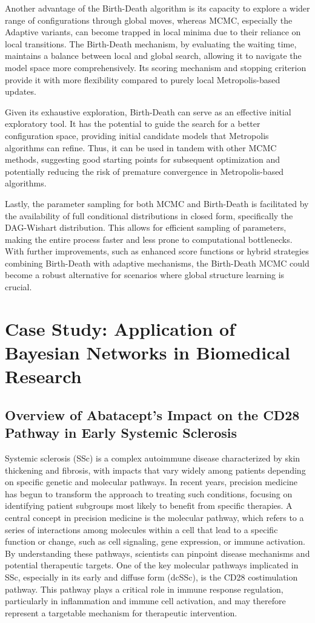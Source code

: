 \documentclass{report}
\begin{document}
Another advantage of the Birth-Death algorithm is its capacity to explore a wider range of configurations through global moves, whereas MCMC, especially the Adaptive variants, can become trapped in local minima due to their reliance on local transitions. The Birth-Death mechanism, by evaluating the waiting time, maintains a balance between local and global search, allowing it to navigate the model space more comprehensively. Its scoring mechanism and stopping criterion provide it with more flexibility compared to purely local Metropolis-based updates.

Given its exhaustive exploration, Birth-Death can serve as an effective initial exploratory tool. It has the potential to guide the search for a better configuration space, providing initial candidate models that Metropolis algorithms can refine. Thus, it can be used in tandem with other MCMC methods, suggesting good starting points for subsequent optimization and potentially reducing the risk of premature convergence in Metropolis-based algorithms.

Lastly, the parameter sampling for both MCMC and Birth-Death is facilitated by the availability of full conditional distributions in closed form, specifically the DAG-Wishart distribution. This allows for efficient sampling of parameters, making the entire process faster and less prone to computational bottlenecks. With further improvements, such as enhanced score functions or hybrid strategies combining Birth-Death with adaptive mechanisms, the Birth-Death MCMC could become a robust alternative for scenarios where global structure learning is crucial.

\chapter{Case Study: Application of Bayesian Networks in Biomedical Research}

\section{Overview of Abatacept’s Impact on the CD28 Pathway in Early Systemic Sclerosis}

Systemic sclerosis (SSc) is a complex autoimmune disease characterized by skin thickening and fibrosis, with impacts that vary widely among patients depending on specific genetic and molecular pathways. In recent years, precision medicine has begun to transform the approach to treating such conditions, focusing on identifying patient subgroups most likely to benefit from specific therapies. A central concept in precision medicine is the molecular pathway, which refers to a series of interactions among molecules within a cell that lead to a specific function or change, such as cell signaling, gene expression, or immune activation. By understanding these pathways, scientists can pinpoint disease mechanisms and potential therapeutic targets. One of the key molecular pathways implicated in SSc, especially in its early and diffuse form (dcSSc), is the CD28 costimulation pathway. This pathway plays a critical role in immune response regulation, particularly in inflammation and immune cell activation, and may therefore represent a targetable mechanism for therapeutic intervention.
\end{document}
